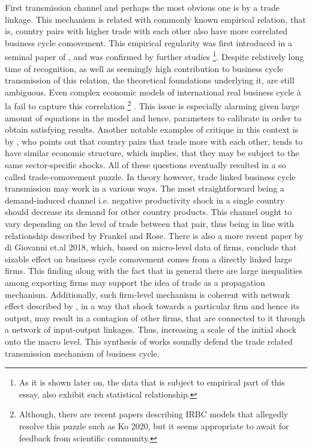 \documentclass{article}
\begin{document}
First transmission channel and perhaps the most obvious one is by a trade linkage. This mechanism is related with commonly known empirical relation, that is, country pairs with higher trade with each other also have more correlated business cycle comovement. This empirical regularity was first introduced in a seminal paper of \cite{frankel_rose}, and was confirmed by further studies \footnote[2]{As it is shown later on, the data that is subject to empirical part of this essay, also exhibit such statistical relationship.}. Despite relatively long time of recognition, as well as seemingly high contribution to business cycle transmission of this relation, the theoretical  foundations underlying it, are still ambiguous. Even complex economic models of international real business cycle à la \cite{backus} fail to capture this correlation \footnote[3]{Although, there are recent papers describing IRBC models that allegedly resolve this puzzle such as Ko 2020, but it seems appropriate to await for feedback from scientific community.} \cite{kose}. This issue is especially alarming given large amount of equations in the model and hence, parameters to calibrate in order to obtain satisfying results. Another notable examples of critique in this context is by \cite{imbs}, who points out that country pairs that trade more with each other, tends to have similar economic structure, which implies, that they may be subject to the same sector-specific shocks. All of these questions eventually resulted in a so called trade-comovement puzzle. In theory however, trade linked business cycle transmission may work in a various ways. The most straightforward being a demand-induced channel i.e. negative productivity shock in a single country should decrease its demand for other country products. This channel ought to vary depending on the level of trade between that pair, thus being in line with relationship described by Frankel and Rose.  There is also a more recent paper by di Giovanni et.al 2018, which, based on micro-level data of firms, conclude that sizable effect on business cycle comovement comes from a directly linked large firms. This finding along with the fact that in general there are large inequalities among exporting firms may support the idea of trade as a propagation mechanism. Additionally, such firm-level mechanism is coherent with network effect described by \cite{acemoglu1}, in a way that shock towards a particular firm and hence its output, may result in a contagion of other firms, that are connected to it through a network of input-output linkages. Thus, increasing a scale of the initial shock onto the macro level. This synthesis of works soundly defend the trade related transmission mechanism of business cycle.
\end{document}
